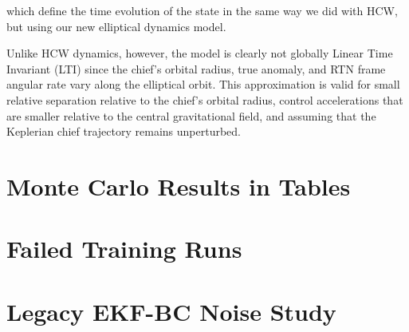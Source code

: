 which define the time evolution of the state in the same way we did with HCW, but using our new elliptical dynamics model.

Unlike HCW dynamics, however, the model is clearly not globally Linear Time Invariant (LTI) since the chief's orbital radius, true anomaly, and RTN frame angular rate vary along the elliptical orbit. This approximation is valid for small relative separation relative to the chief's orbital radius, control accelerations that are smaller relative to the central gravitational field, and assuming that the Keplerian chief trajectory remains unperturbed.



\chapter{Monte Carlo Results in Tables}
\label{appendix:MC_Tables}






\chapter{Failed Training Runs}
\label{appendix:failed-training-runs}



\chapter{Legacy EKF-BC Noise Study}
\label{appendix:legacy-ekf-bc-noise-study}


